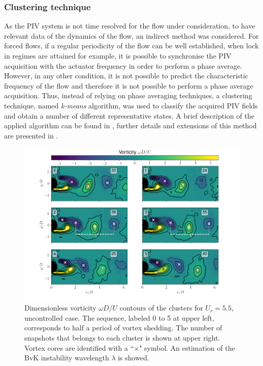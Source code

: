 \documentclass[review]{elsarticle}
\begin{document}
\subsubsection*{Clustering technique}

As the PIV system is not time resolved for the flow under consideration, to have relevant data of the dynamics of the flow, an indirect method was considered. For forced flows, if a regular periodicity of the flow can be well established, when lock in regimes are attained for example, it is possible to synchronise the PIV acquisition with the actuator frequency in order to perform a phase average. However, in any other condition, it is not possible to predict the characteristic frequency of the flow and therefore it is not possible to perform a phase average acquisition. Thus, instead of relying on  phase averaging techniques, a clustering technique, named \textit{k-means} algorithm, was used to classify the acquired PIV fields and obtain a number of different representative states. A brief description of the applied algorithm  can be found in \cite{dadamo2017}, further details and extensions of this method  are presented in \cite{kaiser2014}.

\begin{figure}[h]
\centering 
	\includegraphics[width=\textwidth]{Figures/Fig_09}
	\caption{Dimensionless vorticity $\omega D/U$ contours of the clusters for $U_r=5.5$, uncontrolled case. The sequence, labeled  0 to 5 at upper left, corresponds to half a period of vortex shedding. The number of snapshots that belongs to each cluster is shown at upper right.  Vortex cores are identified with a ``$\times$" symbol. An estimation of the BvK instability wavelength $\lambda$ is showed.}
	\label{fig:09}
\end{figure}
\end{document}
